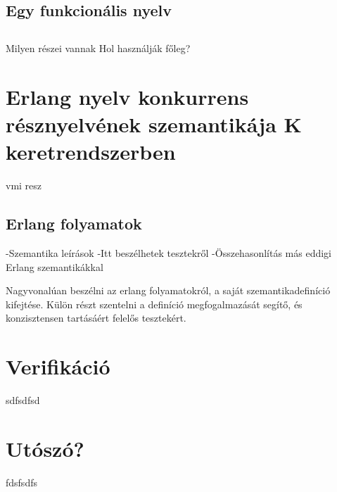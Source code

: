 \documentclass[twoside, a4paper, 12pt]{article}
\begin{document}
\subsection{Egy funkcionális nyelv}

\subsection{}


Milyen részei vannak
Hol használják főleg?
\section{Erlang nyelv konkurrens résznyelvének szemantikája K keretrendszerben}
vmi resz
\subsection{Erlang folyamatok}

    -Szemantika leírások
    -Itt beszélhetek tesztekről
    -Összehasonlítás más eddigi Erlang szemantikákkal
    
    Nagyvonalúan beszélni az erlang folyamatokról, a saját
szemantikadefiníció kifejtése. Külön részt szentelni a definíció megfogalmazását segítő, és
konzisztensen tartásáért felelős tesztekért.

\section{Verifikáció}
sdfsdfsd

\section{Utószó?}
fdsfsdfs


\newpage

\printbibliography[title = {Referencia}]
\end{document}
